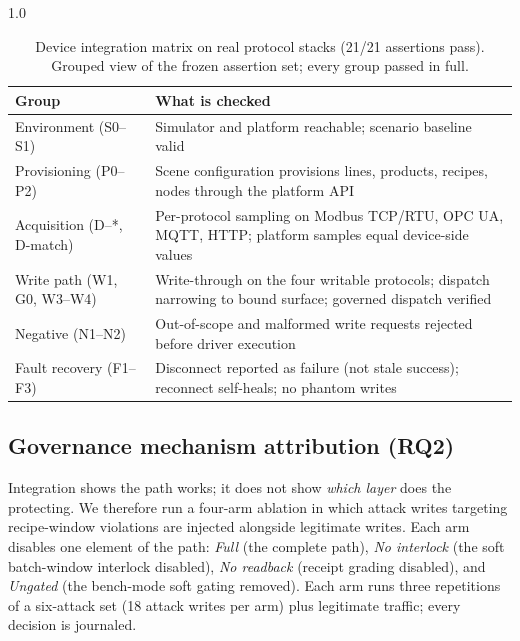 \begin{table}[!t]
\centering
\caption{Device integration matrix on real protocol stacks (21/21
assertions pass). Grouped view of the frozen assertion set; every group
passed in full.}
\label{tab:integration}
\small
\begin{spacing}{1.0}
\begin{tabularx}{\columnwidth}{@{}p{}X@{}}
\toprule
Group & What is checked \\
\midrule
Environment (S0--S1) & Simulator and platform reachable; scenario baseline valid \\
Provisioning (P0--P2) & Scene configuration provisions lines, products, recipes, nodes through the platform API \\
Acquisition (D--*, D-match) & Per-protocol sampling on Modbus TCP/RTU, OPC UA, MQTT, HTTP; platform samples equal device-side values \\
Write path (W1, G0, W3--W4) & Write-through on the four writable protocols; dispatch narrowing to bound surface; governed dispatch verified \\
Negative (N1--N2) & Out-of-scope and malformed write requests rejected before driver execution \\
Fault recovery (F1--F3) & Disconnect reported as failure (not stale success); reconnect self-heals; no phantom writes \\
\bottomrule
\end{tabularx}
\end{spacing}
\end{table}

\subsection{Governance mechanism attribution (RQ2)}
\label{sec:eval-ablation}

Integration shows the path works; it does not show \emph{which layer} does
the protecting. We therefore run a four-arm ablation in which attack
writes targeting recipe-window violations are injected alongside
legitimate writes. Each arm disables one element of the path: \emph{Full}
(the complete path), \emph{No interlock} (the soft batch-window interlock
disabled), \emph{No readback} (receipt grading disabled), and
\emph{Ungated} (the bench-mode soft gating removed). Each arm runs three
repetitions of a six-attack set (18 attack writes per arm) plus
legitimate traffic; every decision is journaled.

